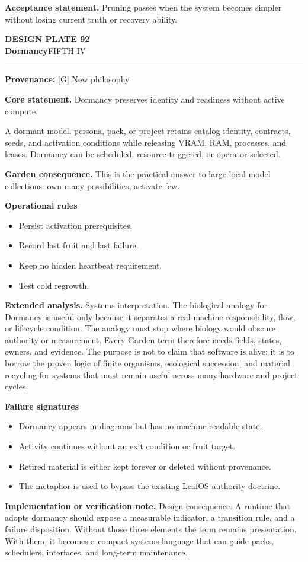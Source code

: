 \documentclass[10pt,letterpaper,oneside]{article}
\newcommand{\prov}[1]{\textcolor{gardenBlue}{\sffamily\footnotesize\textbf{Provenance:} #1}}
\newcommand{\platetitle}[3]{%
  \begin{minipage}[t][0.54in][t]{\textwidth}
  {\sffamily\bfseries\color{gardenDeep}\fontsize{9}{10}\selectfont DESIGN PLATE #1}\\[-1pt]
  {\sffamily\bfseries\color{gardenInk}\fontsize{16.5}{18}\selectfont #2}\hfill{\sffamily\color{gardenGreen}\large #3}
  \end{minipage}\vspace{-2pt}\hrule\vspace{5pt}}
\begin{document}
\begin{acceptbox}
\textbf{Acceptance statement.} Pruning passes when the system becomes simpler without losing current truth or recovery ability.
\end{acceptbox}
\newpage
\platetitle{92}{Dormancy}{FIFTH IV}
\prov{[G] New philosophy}
\fontsize{8.85}{10.45}\selectfont
\begin{corebox}
\textbf{Core statement.} Dormancy preserves identity and readiness without active compute.
\end{corebox}
A dormant model, persona, pack, or project retains catalog identity, contracts, seeds, and activation conditions while releasing VRAM, RAM, processes, and leases. Dormancy can be scheduled, resource-triggered, or operator-selected.

\textbf{Garden consequence.} This is the practical answer to large local model collections: own many possibilities, activate few.

\textbf{Operational rules}
\begin{itemize}
\item Persist activation prerequisites.
\item Record last fruit and last failure.
\item Keep no hidden heartbeat requirement.
\item Test cold regrowth.
\end{itemize}
\textbf{Extended analysis.} Systems interpretation. The biological analogy for Dormancy is useful only because it separates a real machine responsibility, flow, or lifecycle condition. The analogy must stop where biology would obscure authority or measurement. Every Garden term therefore needs fields, states, owners, and evidence. The purpose is not to claim that software is alive; it is to borrow the proven logic of finite organisms, ecological succession, and material recycling for systems that must remain useful across many hardware and project cycles.

\textbf{Failure signatures}
\begin{itemize}
\item Dormancy appears in diagrams but has no machine-readable state.
\item Activity continues without an exit condition or fruit target.
\item Retired material is either kept forever or deleted without provenance.
\item The metaphor is used to bypass the existing LeafOS authority doctrine.
\end{itemize}
\textbf{Implementation or verification note.} Design consequence. A runtime that adopts dormancy should expose a measurable indicator, a transition rule, and a failure disposition. Without those three elements the term remains presentation. With them, it becomes a compact systems language that can guide packs, schedulers, interfaces, and long-term maintenance.
\end{document}
